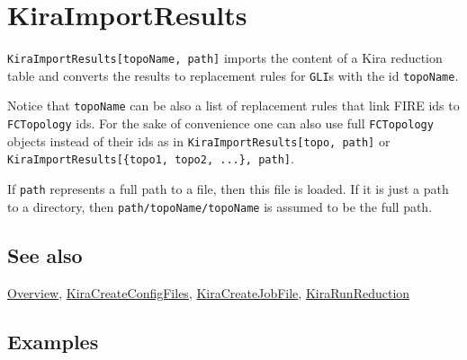 \documentclass[../FeynHelpersManual.tex]{subfiles}
\begin{document}
\hypertarget{kiraimportresults}{
\section{KiraImportResults}\label{kiraimportresults}}

\texttt{KiraImportResults[\allowbreak{}topoName,\ \allowbreak{}path]}
imports the content of a Kira reduction table and converts the results
to replacement rules for \texttt{GLI}s with the id \texttt{topoName}.

Notice that \texttt{topoName} can be also a list of replacement rules
that link FIRE ids to \texttt{FCTopology} ids. For the sake of
convenience one can also use full \texttt{FCTopology} objects instead of
their ids as in
\texttt{KiraImportResults[\allowbreak{}topo,\ \allowbreak{}path]} or
\texttt{KiraImportResults[\allowbreak{}\{\allowbreak{}topo1,\ \allowbreak{}topo2,\ \allowbreak{}...\},\ \allowbreak{}path]}.

If \texttt{path} represents a full path to a file, then this file is
loaded. If it is just a path to a directory, then
\texttt{path/topoName/topoName} is assumed to be the full path.

\subsection{See also}

\hyperlink{toc}{Overview},
\hyperlink{kiracreateconfigfiles}{KiraCreateConfigFiles},
\hyperlink{kiracreatejobfile}{KiraCreateJobFile},
\hyperlink{kirarunreduction}{KiraRunReduction}

\subsection{Examples}

\begin{Shaded}
\begin{Highlighting}[]
\ExtensionTok{=} \OperatorTok{[\{}\OperatorTok{,} \OperatorTok{,} \OperatorTok{,} \OperatorTok{\}]}\NormalTok{;}
\end{Highlighting}
\end{Shaded}

\begin{Shaded}
\begin{Highlighting}[]
\ExtensionTok{=}\OperatorTok{[}\OperatorTok{,}\OperatorTok{]}\NormalTok{;}
\end{Highlighting}
\end{Shaded}
\end{document}
